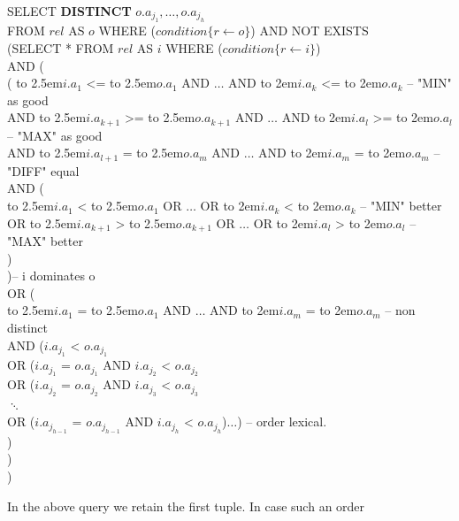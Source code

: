 %
\begin{sql}
\newcommand\abox[1]{\hbox to 2.5em{#1\hfil}}%
\newcommand\bbox[1]{\hbox to 2em{#1\hfil}}%
SELECT \textbf{DISTINCT} $o.a_{j_1}, \ldots, o.a_{j_h}$ \\
FROM $rel$ AS $o$ WHERE ($condition\{r \gets o\}$) AND NOT EXISTS \\
(SELECT * FROM $rel$ AS $i$ WHERE ($condition\{r \gets i\}$)\\
AND (\\
({ }{ }{ }{ }{ }\abox{$i.a_1$} <= \abox{$o.a_1$} AND $\ldots$ AND \bbox{$i.a_k$} <= \bbox{$o.a_k$} -- "MIN" as good\\
AND \abox{$i.a_{k+1}$} >= \abox{$o.a_{k+1}$} AND $\ldots$ AND \bbox{$i.a_l$} >= \bbox{$o.a_l$} -- "MAX" as good\\
AND \abox{$i.a_{l+1}$} { }= \abox{$o.a_m$} AND $\ldots$ AND \bbox{$i.a_m$} { }= \bbox{$o.a_m$} -- "DIFF" equal \\
AND (\\
\phantom{{ }{ }{ }}\abox{$i.a_1$} < \abox{$o.a_1$} OR $\ldots$ OR \bbox{$i.a_k$} < \bbox{$o.a_k$} -- "MIN" better \\
OR \abox{$i.a_{k+1}$} > \abox{$o.a_{k+1}$} OR $\ldots$ OR \bbox{$i.a_l$} > \bbox{$o.a_l$} -- "MAX" better \\
)\\
)-- i dominates o\\
OR (\\
\phantom{AND }\abox{$i.a_1$} { }= \abox{$o.a_1$} AND $\ldots$ AND \bbox{$i.a_m$} { }= \bbox{$o.a_m$} -- non distinct\\
AND ($i.a_{j_1}$ < $o.a_{j_1}$\\
OR ($i.a_{j_1}$ = $o.a_{j_1}$ AND $i.a_{j_2}$ < $o.a_{j_2}$\\
OR ($i.a_{j_2}$ = $o.a_{j_2}$ AND $i.a_{j_3}$ < $o.a_{j_3}$\\
$\ddots$\\
OR ($i.a_{j_{h-1}}$ = $o.a_{j_{h-1}}$ AND $i.a_{j_h}$ < $o.a_{j_h}$)$\ldots$) -- order lexical.\\
)\\
)\\
)
\end{sql}
%
In the above query we retain the first tuple. In case such an order
